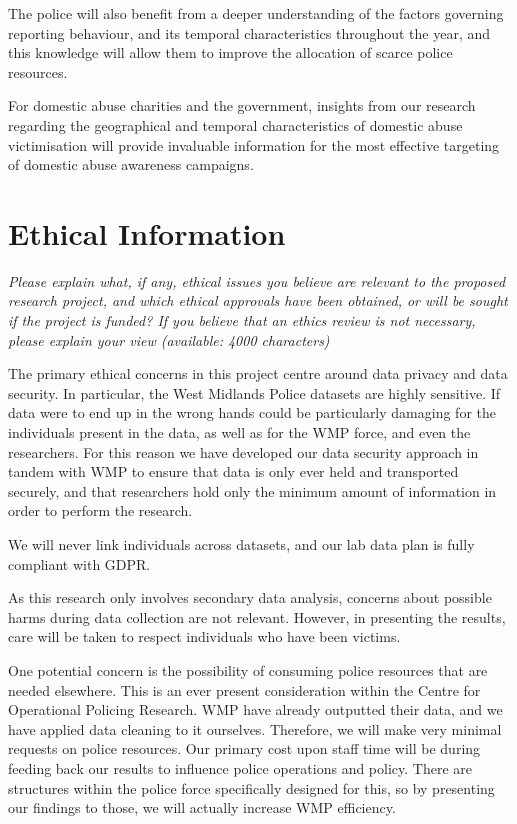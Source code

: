 \documentclass[11pt, a4paper]{article}
\begin{document}
The police will also benefit from a deeper understanding of the factors governing reporting behaviour, and its temporal characteristics throughout the year, and this knowledge will allow them to improve the allocation of scarce police resources. 

For domestic abuse charities and the government, insights from our research regarding the geographical and temporal characteristics of domestic abuse victimisation will provide invaluable information for the most effective targeting of domestic abuse awareness campaigns. 

  
  

\section{Ethical Information}

\textit{Please explain what, if any, ethical issues you believe are relevant to the proposed research project, and which ethical approvals have been obtained, or will be sought if the project is funded? If you believe that an ethics review is not necessary, please explain your view (available: 4000 characters)}

The primary ethical concerns in this project centre around data privacy and data security. In particular, the West Midlands Police datasets are highly sensitive. If data were to end up in the wrong hands could be particularly damaging for the individuals present in the data, as well as for the WMP force, and even the researchers. For this reason we have developed our data security approach in tandem with WMP to ensure that data is only ever held and transported securely, and that researchers hold only the minimum amount of information in order to perform the research.

We will never link individuals across datasets, and our lab data plan is fully compliant with GDPR.

As this research only involves secondary data analysis, concerns about possible harms during data collection are not relevant. However, in presenting the results, care will be taken to respect individuals who have been victims.

One potential concern is the possibility of consuming police resources that are needed elsewhere. This is an ever present consideration within the Centre for Operational Policing Research. WMP have already outputted their data, and we have applied data cleaning to it ourselves. Therefore, we will make very minimal requests on police resources. Our primary cost upon staff time will be during feeding back our results to influence police operations and policy. There are structures within the police force specifically designed for this, so by presenting our findings to those, we will actually increase WMP efficiency.
\end{document}
